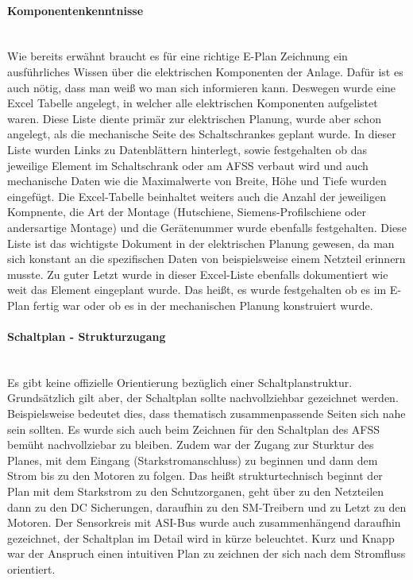     \paragraph{Komponentenkenntnisse}\mbox{}\\
    Wie bereits erwähnt braucht es für eine richtige E-Plan Zeichnung ein ausführliches Wissen über die elektrischen Komponenten der Anlage. Dafür ist es auch nötig, dass man weiß wo man sich informieren kann. Deswegen wurde eine Excel Tabelle angelegt, in welcher alle elektrischen Komponenten aufgelistet waren. Diese Liste diente primär zur elektrischen Planung, wurde aber schon angelegt, als die mechanische Seite des Schaltschrankes geplant wurde. In dieser Liste wurden Links zu Datenblättern hinterlegt, sowie festgehalten ob das jeweilige Element im Schaltschrank oder am AFSS verbaut wird und auch mechanische Daten wie die Maximalwerte von Breite, Höhe und Tiefe wurden eingefügt. Die Excel-Tabelle beinhaltet weiters auch die Anzahl der jeweiligen Kompnente, die Art der Montage (Hutschiene, Siemens-Profilschiene oder andersartige Montage) und die Gerätenummer wurde ebenfalls festgehalten. Diese Liste ist das wichtigste Dokument in der elektrischen Planung gewesen, da man sich konstant an die spezifischen Daten von beispielsweise einem Netzteil erinnern musste. Zu guter Letzt wurde in dieser Excel-Liste ebenfalls dokumentiert wie weit das Element eingeplant wurde. Das heißt, es wurde festgehalten ob es im E-Plan fertig war oder ob es in der mechanischen Planung konstruiert wurde.
    \paragraph{Schaltplan - Strukturzugang}\mbox{}\\
    Es gibt keine offizielle Orientierung bezüglich einer Schaltplanstruktur. Grundsätzlich gilt aber, der Schaltplan sollte nachvollziehbar gezeichnet werden. Beispielsweise bedeutet dies, dass thematisch zusammenpassende Seiten sich nahe sein sollten. Es wurde sich auch beim Zeichnen für den Schaltplan des AFSS bemüht nachvollziebar zu bleiben. Zudem war der Zugang zur Sturktur des Planes, mit dem Eingang (Starkstromanschluss) zu beginnen und dann dem Strom bis zu den Motoren zu folgen. Das heißt strukturtechnisch beginnt der Plan mit dem Starkstrom zu den Schutzorganen, geht über zu den Netzteilen dann zu den DC Sicherungen, daraufhin zu den SM-Treibern und zu Letzt zu den Motoren. Der Sensorkreis mit ASI-Bus wurde auch zusammenhängend daraufhin gezeichnet, der Schaltplan im Detail wird in kürze beleuchtet. Kurz und Knapp war der Anspruch einen intuitiven Plan zu zeichnen der sich nach dem Stromfluss orientiert. 

